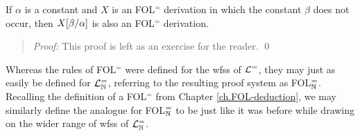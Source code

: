 %

\begin{Lthm} \label{lemma:FOL-prsub}
  If $\alpha$ is a constant and $X$ is an FOL$^=$ derivation in which the constant $\beta$ does not occur, then $X[\beta/\alpha]$ is also an FOL$^=$ derivation.
\end{Lthm}

\begin{quote} 
  \textit{Proof:}
  This proof is left as an exercise for the reader.
  \qed
\end{quote}


Whereas the rules of FOL$^=$ were defined for the wfss of $\mathcal{L}^{=}$, they may just as easily be defined for $\mathcal{L}^{=}_{\mathbb{N}}$, referring to the resulting proof system as FOL$^=_{\mathbb{N}}$. 
Recalling the definition of a FOL$^=$  from Chapter \ref{ch.FOL-deduction}, we may similarly define the analogue for FOL$^=_{\mathbb{N}}$ to be just like it was before while drawing on the wider range of wfss of $\mathcal{L}^{=}_{\mathbb{N}}$.

